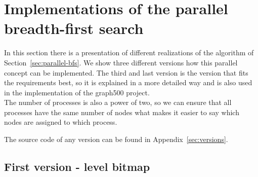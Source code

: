 \documentclass[12pt,a4paper]{article}
\begin{document}
\section{Implementations of the parallel breadth-first search}
\label{sec:implementations}

In this section there is a presentation of different realizations of the algorithm of Section~\ref{sec:parallel-bfs}. We show three different versions how this parallel concept can be implemented. The third and last version is the version that fits the requirements best, so it is explained in a more detailed way and is also used in the implementation of the graph500 project.\\

The number of processes is also a power of two, so we can ensure that all processes have the same number of nodes what makes it easier to say which nodes are assigned to which process.

The source code of any version can be found in Appendix~\ref{sec:versions}.

\subsection{First version - level bitmap}
\label{sec:firstversion}
\end{document}

